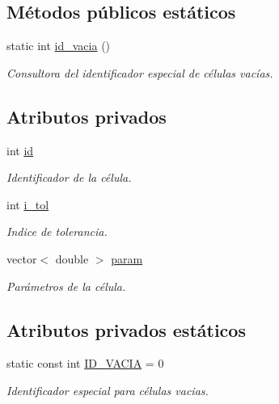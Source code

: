 \subsection*{Métodos públicos estáticos}
\begin{DoxyCompactItemize}
\item 
static int \hyperlink{class_celula_ad1f2960d79a418652964b6aeedaa8243}{id\+\_\+vacia} ()
\begin{DoxyCompactList}\small\item\em Consultora del identificador especial de células vacías. \end{DoxyCompactList}\end{DoxyCompactItemize}
\subsection*{Atributos privados}
\begin{DoxyCompactItemize}
\item 
int \hyperlink{class_celula_a0984a8b3deeed4979ed6f6141edc3c0c}{id}
\begin{DoxyCompactList}\small\item\em Identificador de la célula. \end{DoxyCompactList}\item 
int \hyperlink{class_celula_abda46be7b30a13909d9819c46238080b}{i\+\_\+tol}
\begin{DoxyCompactList}\small\item\em Indice de tolerancia. \end{DoxyCompactList}\item 
vector$<$ double $>$ \hyperlink{class_celula_a386c6da3af12b5662e3866675d60a4b7}{param}
\begin{DoxyCompactList}\small\item\em Parámetros de la célula. \end{DoxyCompactList}\end{DoxyCompactItemize}
\subsection*{Atributos privados estáticos}
\begin{DoxyCompactItemize}
\item 
static const int \hyperlink{class_celula_affff67b41ead0b1f3a3f4faad6c049ac}{I\+D\+\_\+\+V\+A\+C\+IA} = 0
\begin{DoxyCompactList}\small\item\em Identificador especial para células vacias. \end{DoxyCompactList}\end{DoxyCompactItemize}


